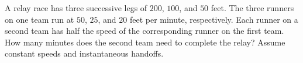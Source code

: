 A relay race has three successive legs of $200$, $100$, and $50$ feet. The three runners on one team run at $50$, $25$, and $20$ feet per minute, respectively. Each runner on a second team has half the speed of the corresponding runner on the first team. How many minutes does the second team need to complete the relay? Assume constant speeds and instantaneous handoffs.
